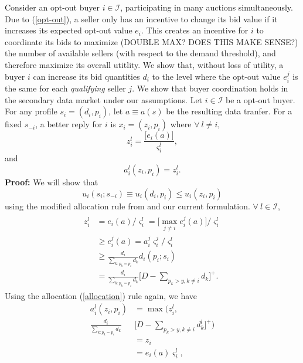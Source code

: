 \documentclass[12pt]{article}
\theoremstyle{definition}
\newcommand{\vs}{\varsigma}
\begin{document}
\begin{multicols}{2}
Consider an opt-out buyer $i\in\mathcal{I}$, participating in many auctions
simultaneously. Due to (\ref{opt-out}), a seller only has an incentive to change its
bid value if it increases its expected opt-out value $e_i$. This creates an
incentive for $i$ to coordinate its bids to maximize (DOUBLE MAX? DOES THIS
MAKE SENSE?) the number of available sellers (with respect to the demand
threshold), and therefore maximize its overall
utitlity. We show that, without loss of utility, a buyer $i$ can increase its
bid quantities $d_i$ to the level where the opt-out value $e_i^j$ is the same
for each
\emph{qualifying} seller $j$. We show that buyer coordination \cite{semret} holds in the
secondary data market under our assumptions.
{
 Let $i\in\mathcal{I}$ be a opt-out buyer.
For any profile $s_i = (d_i, p_i)$, let $a \equiv a(s)$ be the resulting data
tranfer. For a fixed $s_{-i}$, a better reply for $i$ is $x_i =
(z_i,p_i)$ where $\forall \ l \ne i$,
$$
    z_i^l = \frac{\big\lbrack e_i(a) \big\rbrack}{\vs_i^l},
$$
and
\begin{equation}\label{coordination}
    a_i^l(z_i,p_i) = z_i^l.
\end{equation}
}
\textbf{Proof:} We will show that
\begin{equation}
    u_i(s_i;s_{-i}) \equiv u_i(d_i,p_i) \le u_i(z_i,p_i)
\end{equation}
using the modified allocation rule from \cite{tuffin} and our current
formulation. $\forall \ l \in \mathcal{I}$,
\begin{align}
\begin{split}
    z_i^l &= e_i(a)/\vs_i^l = \big[\max_{j\ne i} e_i^j(a)\big]/ \vs_i^l\\
    & \ge  e_i^j(a) = a_i^j\vs_i^j/\vs_i^l\\
    & \ge \frac{d_i}{\sum_{k:p_k=p_i} d_k}d_i(p_i;s_i) \\
    & = \frac{d_i}{\sum_{k:p_k=p_i} d_k}\bigg[D-\displaystyle\sum_{p_k>y,k\ne
i} d_k\bigg]^+.
\end{split}
\end{align}
Using the allocation (\ref{allocation}) rule again, we have
\begin{align*}
    a_i^l(z_i,p_i) &= \max\bigg(z_i^l, \\
\frac{d_i}{\sum_{k:p_k=p_i} d_k}&\bigg[D-\displaystyle\sum_{p_k>y,k\ne
i} d_k^l\bigg]^+\bigg) \\
    &= z_i \\
    &= e_i(a)\vs_i^l,
\end{align*}

\end{multicols}
\end{document}
